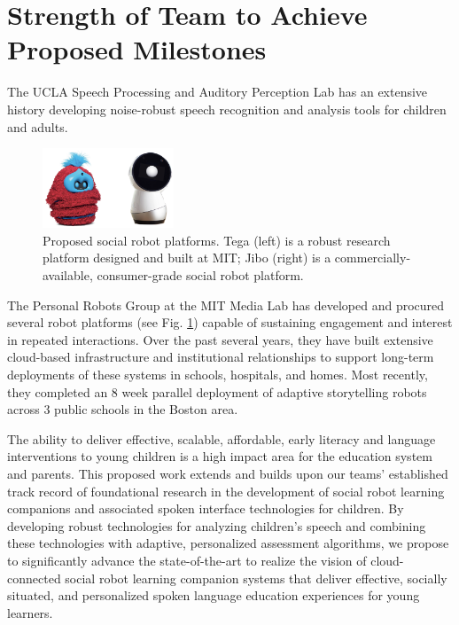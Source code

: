 \section{Strength of Team to Achieve Proposed Milestones}
\vspace{-3mm}
The UCLA Speech Processing and Auditory Perception Lab has an extensive history developing noise-robust speech recognition and analysis tools for children and adults.  

\begin{figure}
  \centering
  \includegraphics[width=0.35\textwidth]{fig/tega_jibo_combined.png}  
  \caption{Proposed social robot platforms. Tega (left) is a robust research platform designed and built at MIT; Jibo (right) is a commercially-available, consumer-grade social robot platform.}
  \label{fig:robots}
\end{figure}

The Personal Robots Group at the MIT Media Lab has developed and procured several robot platforms (see Fig. \ref{fig:robots}) capable of sustaining engagement and interest in repeated interactions. Over the past several years, they have built extensive cloud-based infrastructure and institutional relationships to support long-term deployments of these systems in schools, hospitals, and homes. Most recently, they completed an 8 week parallel deployment of adaptive storytelling robots across 3 public schools in the Boston area.

The ability to deliver effective, scalable, affordable, early literacy and language interventions to young children is a high impact area for the education system and parents. This proposed work extends and builds upon our teams' established track record of foundational research in the development of social robot learning companions and associated spoken interface technologies for children. By developing robust technologies for analyzing children's speech and combining these technologies with adaptive, personalized assessment algorithms, we propose to significantly advance the state-of-the-art to realize the vision of cloud-connected social robot learning companion systems that deliver effective, socially situated, and personalized spoken language education experiences for young learners.\\



